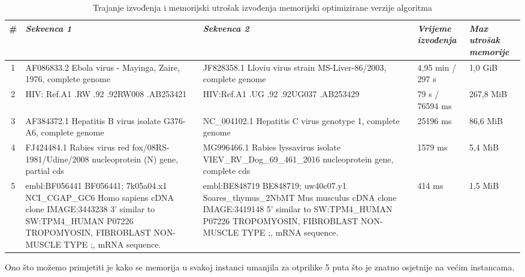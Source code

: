 \documentclass[a4paper]{article}
\begin{document}
\begin{table}[H]
\centering
\begin{tabular}{|c||p{4cm}|p{4.25cm}|p{2cm}|p{2cm}|}
\hline
\# & \textit{\textbf{Sekvenca 1}} & \textit{\textbf{Sekvenca 2}} & \textit{\textbf{Vrijeme izvođenja}} & \textit{\textbf{Max utrošak memorije}} \\ \hline
1 & AF086833.2 Ebola virus - Mayinga, Zaire, 1976, complete genome & JF828358.1 Lloviu virus strain MS-Liver-86/2003, complete genome & 4,95 min / 297 s & 1,0 GiB \\ \hline
2 & HIV: Ref.A1 .RW .92 .92RW008 .AB253421 & HIV:Ref.A1 .UG .92 .92UG037 .AB253429 & 79 s / 76594 ms & 267,8 MiB \\ \hline
3 & AF384372.1 Hepatitis B virus isolate G376-A6, complete genome & NC\_004102.1 Hepatitis C virus genotype 1, complete genome & 25196 ms & 86,6 MiB \\ \hline
4 & FJ424484.1 Rabies virus red fox/08RS-1981/Udine/2008 nucleoprotein (N) gene, partial cds & MG996466.1 Rabies lyssavirus isolate VIEV\_RV\_Dog\_69\_461\_2016 nucleoprotein gene, complete cds & 1579 ms & 5,4 MiB \\ \hline
5 & embl:BF056441 BF056441; 7k05a04.x1 NCI\_CGAP\_GC6 Homo sapiens cDNA clone IMAGE:3443238 3' similar to SW:TPM4\_HUMAN P07226 TROPOMYOSIN, FIBROBLAST NON-MUSCLE TYPE ;, mRNA sequence. & embl:BE848719 BE848719; uw40c07.y1 Soares\_thymus\_2NbMT Mus musculus cDNA clone IMAGE:3419148 5' similar to SW:TPM4\_HUMAN P07226 TROPOMYOSIN, FIBROBLAST NON-MUSCLE TYPE ;, mRNA sequence. & 414 ms & 1,5 MiB \\ \hline
\end{tabular}
\caption{Trajanje izvođenja i memorijski utrošak izvođenja memorijski optimizirane verzije algoritma}
\label{table:economicSchools}   
\end{table}

Ono što možemo primjetiti je kako se memorija u svakoj instanci umanjila za otprilike 5 puta što je znatno osjetnije na većim instancama.
\end{document}
